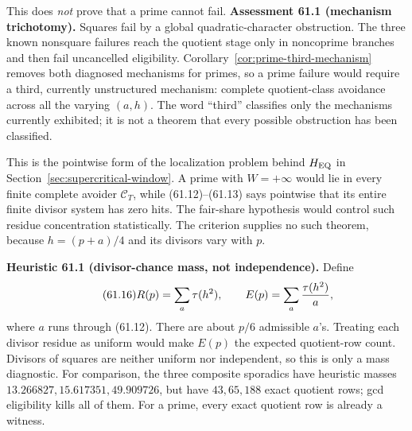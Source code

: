\documentclass[10pt,reqno]{amsart}
\theoremstyle{definition}
\newcommand{\1}{\mathbf 1}
\begin{document}
This does \emph{not} prove that a prime cannot fail.
\medskip\noindent\textbf{Assessment 61.1 (mechanism trichotomy).}
Squares fail by a global quadratic-character obstruction.  The three known
nonsquare failures reach the quotient stage only in noncoprime branches and
then fail uncancelled eligibility.  Corollary~\ref{cor:prime-third-mechanism}
removes both diagnosed mechanisms for primes, so a prime failure would
require a third, currently unstructured mechanism: complete quotient-class
avoidance across all the varying $(a,h)$.  The word ``third'' classifies only the mechanisms currently
exhibited; it is not a theorem that every possible obstruction has been
classified.

This is the pointwise form of the localization problem behind $H_{\rm EQ}$
in Section~\ref{sec:supercritical-window}.  A prime with $W=+\infty$ would
lie in every finite complete avoider $\mathcal C_T$, while
(61.12)--(61.13) says pointwise that its entire finite divisor system has
zero hits.  The fair-share hypothesis would control such residue
concentration statistically.  The criterion supplies no such theorem,
because $h=(p+a)/4$ and its divisors vary with $p$.

\medskip\noindent\textbf{Heuristic 61.1 (divisor-chance mass, not
independence).}
Define
\begin{equation}\tag{61.16}
 R(p)=\sum_a\tau(h^2),\qquad
 E(p)=\sum_a{\tau(h^2)\over a},
\end{equation}
where $a$ runs through (61.12).  There are about $p/6$ admissible $a$'s.
Treating each divisor residue as uniform would make $E(p)$ the expected
quotient-row count.  Divisors of squares are neither uniform nor independent,
so this is only a mass diagnostic.  For comparison, the three composite
sporadics have heuristic masses
$13.266827,15.617351,49.909726$, but have $43,65,188$ exact quotient rows;
gcd eligibility kills all of them.  For a prime, every exact quotient row is
already a witness.
\end{document}
